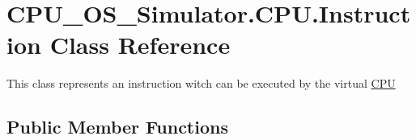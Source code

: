 \hypertarget{class_c_p_u___o_s___simulator_1_1_c_p_u_1_1_instruction}{}\section{C\+P\+U\+\_\+\+O\+S\+\_\+\+Simulator.\+C\+P\+U.\+Instruction Class Reference}
\label{class_c_p_u___o_s___simulator_1_1_c_p_u_1_1_instruction}


This class represents an instruction witch can be executed by the virtual \hyperlink{namespace_c_p_u___o_s___simulator_1_1_c_p_u}{C\+P\+U}  


\subsection*{Public Member Functions}
